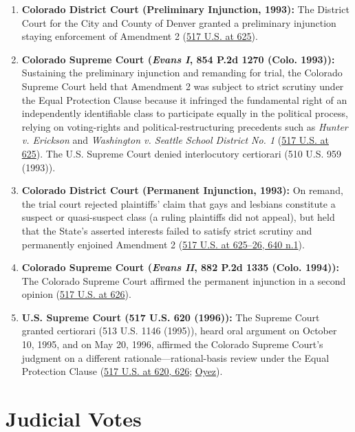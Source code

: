 \documentclass[12pt]{article}
\begin{document}
\begin{enumerate}
\item \textbf{Colorado District Court (Preliminary Injunction, 1993):} The District Court for the City and County of Denver granted a preliminary injunction staying enforcement of Amendment 2 (\href{https://supreme.justia.com/cases/federal/us/517/620/}{517 U.S. at 625}).
\item \textbf{Colorado Supreme Court (\textit{Evans I}, 854 P.2d 1270 (Colo. 1993)):} Sustaining the preliminary injunction and remanding for trial, the Colorado Supreme Court held that Amendment 2 was subject to strict scrutiny under the Equal Protection Clause because it infringed the fundamental right of an independently identifiable class to participate equally in the political process, relying on voting-rights and political-restructuring precedents such as \textit{Hunter v. Erickson} and \textit{Washington v. Seattle School District No. 1} (\href{https://supreme.justia.com/cases/federal/us/517/620/}{517 U.S. at 625}). The U.S. Supreme Court denied interlocutory certiorari (510 U.S. 959 (1993)).
\item \textbf{Colorado District Court (Permanent Injunction, 1993):} On remand, the trial court rejected plaintiffs' claim that gays and lesbians constitute a suspect or quasi-suspect class (a ruling plaintiffs did not appeal), but held that the State's asserted interests failed to satisfy strict scrutiny and permanently enjoined Amendment 2 (\href{https://supreme.justia.com/cases/federal/us/517/620/}{517 U.S. at 625--26, 640 n.1}).
\item \textbf{Colorado Supreme Court (\textit{Evans II}, 882 P.2d 1335 (Colo. 1994)):} The Colorado Supreme Court affirmed the permanent injunction in a second opinion (\href{https://supreme.justia.com/cases/federal/us/517/620/}{517 U.S. at 626}).
\item \textbf{U.S. Supreme Court (517 U.S. 620 (1996)):} The Supreme Court granted certiorari (513 U.S. 1146 (1995)), heard oral argument on October 10, 1995, and on May 20, 1996, affirmed the Colorado Supreme Court's judgment on a different rationale---rational-basis review under the Equal Protection Clause (\href{https://supreme.justia.com/cases/federal/us/517/620/}{517 U.S. at 620, 626}; \href{https://www.oyez.org/cases/1995/94-1039}{Oyez}).
\end{enumerate}

\section{Judicial Votes}
\end{document}
